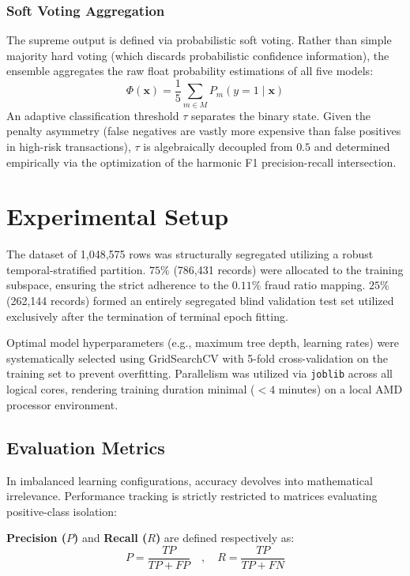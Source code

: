 \documentclass[conference]{IEEEtran}
\begin{document}
\subsubsection{Soft Voting Aggregation}
The supreme output is defined via probabilistic soft voting. Rather than simple majority hard voting (which discards probabilistic confidence information), the ensemble aggregates the raw float probability estimations of all five models:
\begin{equation}
    \Phi(\mathbf{x}) = \frac{1}{5} \sum_{m \in M} P_m(y=1 \mid \mathbf{x})
\end{equation}
An adaptive classification threshold $\tau$ separates the binary state. Given the penalty asymmetry (false negatives are vastly more expensive than false positives in high-risk transactions), $\tau$ is algebraically decoupled from $0.5$ and determined empirically via the optimization of the harmonic F1 precision-recall intersection.

\section{Experimental Setup}
\label{sec:experiments}

The dataset of 1,048,575 rows was structurally segregated utilizing a robust temporal-stratified partition. $75\%$ (786,431 records) were allocated to the training subspace, ensuring the strict adherence to the $0.11\%$ fraud ratio mapping. $25\%$ (262,144 records) formed an entirely segregated blind validation test set utilized exclusively after the termination of terminal epoch fitting. 

Optimal model hyperparameters (e.g., maximum tree depth, learning rates) were systematically selected using GridSearchCV with 5-fold cross-validation on the training set to prevent overfitting. Parallelism was utilized via \texttt{joblib} across all logical cores, rendering training duration minimal ($< 4$ minutes) on a local AMD processor environment.

\subsection{Evaluation Metrics}
In imbalanced learning configurations, accuracy devolves into mathematical irrelevance. Performance tracking is strictly restricted to matrices evaluating positive-class isolation:

\textbf{Precision ($P$)} and \textbf{Recall ($R$)} are defined respectively as:
\begin{equation}
    P = \frac{TP}{TP + FP} \quad , \quad R = \frac{TP}{TP + FN}
\end{equation}
\end{document}
